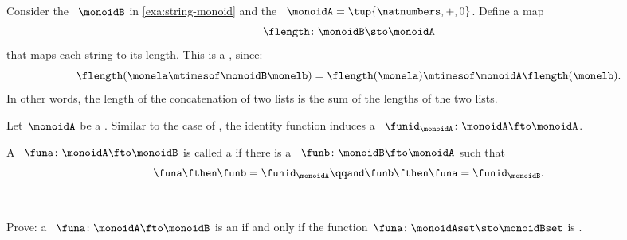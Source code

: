 \begin{example}
    \label{exa:string-length}
    Consider the ~$\monoidB$ in \cref{exa:string-monoid} and the ~$\monoidA=\tup{\natnumbers, +, 0}$.
    Define a map
    \begin{equation}
        \flength \colon \monoidB \sto \monoidA
    \end{equation}
    that maps each string to its length.
    This is a , since:
    \begin{equation}
        \flength(\monela \mtimesof\monoidB \monelb)=\flength(\monela)\mtimesof\monoidA \flength(\monelb).
    \end{equation}
    In other words, the length of the concatenation of two lists is the sum of the lengths of the two lists.
\end{example}

\begin{ctdefinition}
    \label{def:identity-mon-mor}
    Let~$\monoidA$ be a .
    Similar to the case of , the identity function induces a ~$\funid_\monoidA\colon \monoidA \fto \monoidA$.
\end{ctdefinition}

\begin{ctdefinition}
    \label{def:monoid-isomorphism}
    A ~$\funa\colon \monoidA \fto \monoidB$ is called a  if there is a ~$\funb\colon \monoidB \fto \monoidA$ such that
    \begin{equation}
        \funa \fthen \funb = \funid_\monoidA \qqand \funb \fthen \funa = \funid_\monoidB.
    \end{equation}
\end{ctdefinition}


\clearpage

~

\vfill%

\begin{gradedexercise}
    Prove: a ~$\funa\colon \monoidA \fto \monoidB$ is an  if and only if the function~$\funa\colon \monoidAset \sto \monoidBset$ is .
\end{gradedexercise}

